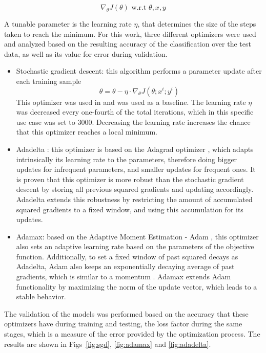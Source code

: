 \begin{equation}
    \nabla_\theta J(\theta) \text{  w.r.t } \theta, x, y
\end{equation}

A tunable parameter is the learning rate \(\eta\), that determines the size of the steps taken to reach the minimum. For this work, three different optimizers were used and analyzed based on the resulting accuracy of the classification over the test data, as well as its value for error during validation.

\begin{itemize}
    \item Stochastic gradient descent: this algorithm performs a parameter update after each training sample
        \begin{equation}
            \theta = \theta - \eta \cdot \nabla_\theta J(\theta;x^i;y^i)
        \end{equation}
        This optimizer was used in \cite{Paisana2017} and was used as a baseline. The learning rate \(\eta\) was decreased every one-fourth of the total iterations, which in this specific use case was set to 3000. Decreasing the learning rate increases the chance that this optimizer reaches a local minimum.
    \item Adadelta \cite{Zeiler2012a}: this optimizer is based on the Adagrad optimizer \cite{Duchi2011}, which adapts intrinsically its learning rate to the parameters, therefore doing bigger updates for infrequent parameters, and smaller updates for frequent ones. It is proven that this optimizer is more robust than the stochastic gradient descent \cite{Duchi2011} by storing all previous squared gradients and updating accordingly. Adadelta extends this robustness by restricting the amount of accumulated squared gradients to a fixed window, and using this accumulation for its updates.
    \item Adamax: based on the Adaptive Moment Estimation - Adam \cite{Kingma2014}, this optimizer also sets an adaptive learning rate based on the parameters of the objective function. Additionally, to set a fixed window of past squared decays as Adadelta, Adam also keeps an exponentially decaying average of past gradients, which is similar to a momentum \cite{Dahl2013}. Adamax extends Adam functionality by maximizing the norm of the update vector, which leads to a stable behavior.
\end{itemize}

The validation of the models was performed based on the accuracy that these optimizers have during training and testing, the loss factor during the same stages, which is a measure of the error provided by the optimization process. The results are shown in Figs~\ref{fig:sgd}, \ref{fig:adamax} and \ref{fig:adadelta}.

